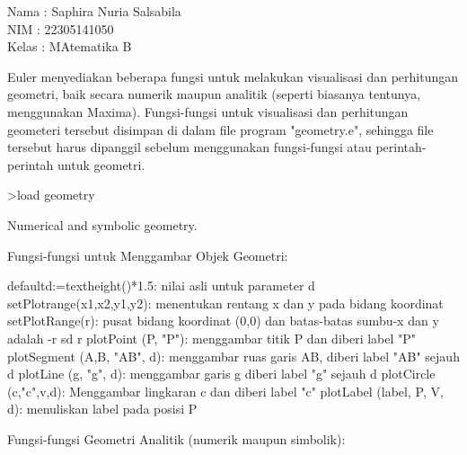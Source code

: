 \documentclass{article}
\begin{document}
\begin{eulernotebook}
\eulersubheading{}
\begin{eulercomment}
Nama  : Saphira Nuria Salsabila\\
NIM   : 22305141050\\
Kelas : MAtematika B

\begin{eulercomment}
\begin{eulercomment}
Euler menyediakan beberapa fungsi untuk melakukan visualisasi dan
perhitungan geometri, baik secara numerik maupun analitik (seperti
biasanya tentunya, menggunakan Maxima). Fungsi-fungsi untuk
visualisasi dan perhitungan geometeri tersebut disimpan di dalam file
program "geometry.e", sehingga file tersebut harus dipanggil sebelum
menggunakan fungsi-fungsi atau perintah-perintah untuk geometri.
\end{eulercomment}
\begin{eulerprompt}
>load geometry
\end{eulerprompt}
\begin{euleroutput}
  Numerical and symbolic geometry.
\end{euleroutput}
\begin{eulercomment}
Fungsi-fungsi untuk Menggambar Objek Geometri:

\end{eulercomment}
\begin{eulerttcomment}
  defaultd:=textheight()*1.5: nilai asli untuk parameter d
  setPlotrange(x1,x2,y1,y2): menentukan rentang x dan y pada bidang koordinat
  setPlotRange(r): pusat bidang koordinat (0,0) dan batas-batas sumbu-x dan y adalah -r sd r
  plotPoint (P, "P"): menggambar titik P dan diberi label "P"
  plotSegment (A,B, "AB", d): menggambar ruas garis AB, diberi label "AB" sejauh d
  plotLine (g, "g", d): menggambar garis g diberi label "g" sejauh d
  plotCircle (c,"c",v,d): Menggambar lingkaran c dan diberi label "c"
  plotLabel (label, P, V, d): menuliskan label pada posisi P
\end{eulerttcomment}
\begin{eulercomment}

Fungsi-fungsi Geometri Analitik (numerik maupun simbolik):


\end{eulercomment}
\end{eulercomment}
\end{eulercomment}
\end{eulernotebook}
\end{document}
